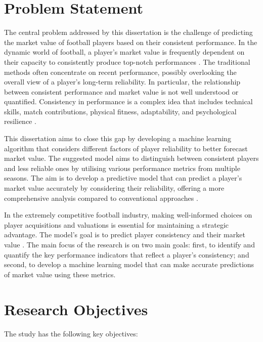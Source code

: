 \documentclass[12pt, a4paper,oneside]{book}
\numberwithin{equation}{section}
\begin{document}
\section{Problem Statement}\label{sec:1.2}

The central problem addressed by this dissertation is the challenge of predicting the market value of football players based on their consistent performance. In the dynamic world of football, a player's market value is frequently dependent on their capacity to consistently produce top-notch performances \cite{johnson2018}. The traditional methods often concentrate on recent performance, possibly overlooking the overall view of a player's long-term reliability. In particular, the relationship between consistent performance and market value is not well understood or quantified. Consistency in performance is a complex idea that includes technical skills, match contributions, physical fitness, adaptability, and psychological resilience \cite{garcia2022}. 

This dissertation aims to close this gap by developing a machine learning algorithm that considers different factors of player reliability to better forecast market value. The suggested model aims to distinguish between consistent players and less reliable ones by utilising various performance metrics from multiple seasons. The aim is to develop a predictive model that can predict a player's market value accurately by considering their reliability, offering a more comprehensive analysis compared to conventional approaches \cite{taylor2019}.

In the extremely competitive football industry, making well-informed choices on player acquisitions and valuations is essential for maintaining a strategic advantage. The model's goal is to predict player consistency and their market value \cite{martinezj2020}. The main focus of the research is on two main goals: first, to identify and quantify the key performance indicators that reflect a player’s consistency; and second, to develop a machine learning model that can make accurate predictions of market value using these metrics.

\section{Research Objectives}\label{sec:1.3}

The study has the following key objectives:
\end{document}
